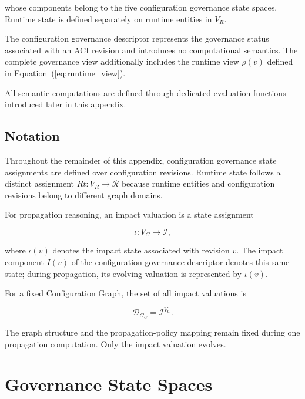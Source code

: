 \documentclass[10pt]{article}
\begin{document}
whose components belong to the five configuration governance state spaces.
Runtime state is defined separately on runtime entities in $V_R$.

The configuration governance descriptor represents the governance status associated with an ACI revision and introduces no computational semantics. The complete governance view additionally includes the runtime view $\rho(v)$ defined in Equation~(\ref{eq:runtime_view}).


All semantic computations are defined through dedicated evaluation functions introduced later in this appendix.

\subsection{Notation}

Throughout the remainder of this appendix, configuration governance state assignments are defined over configuration revisions. Runtime state follows a distinct assignment $Rt:V_R\rightarrow\mathcal{R}$ because runtime entities and configuration revisions belong to different graph domains.

For propagation reasoning, an impact valuation is a state assignment

\begin{equation}
	\iota : V_C \rightarrow \mathcal{I},
	\label{eq:impact_valuation}
\end{equation}

where $\iota(v)$ denotes the impact state associated with revision $v$. The
impact component $I(v)$ of the configuration governance descriptor denotes this
same state; during propagation, its evolving valuation is represented by
$\iota(v)$.

For a fixed Configuration Graph, the set of all impact valuations is

\begin{equation}
	\mathcal{D}_{G_C}
	=
	\mathcal{I}^{V_C}.
	\label{eq:impact_valuation_domain}
\end{equation}

The graph structure and the propagation-policy mapping remain fixed during one propagation computation. Only the impact valuation evolves.

\section{Governance State Spaces}
\label{appendix:state_spaces}
\end{document}
